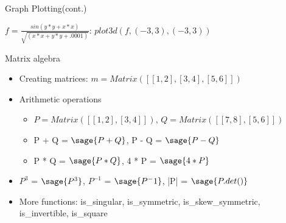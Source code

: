 \documentclass{beamer}
\begin{document}
\begin{frame}{Graph Plotting(cont.)}
  \begin{center}
    $f = \frac{sin(y*y+x*x)}{\sqrt{(x*x+y*y+.0001)}}$: $plot3d(f, (-3, 3), (-3, 3))$
  \end{center}
\end{frame}

\begin{frame}{Matrix algebra}
  \begin{itemize}
   \item Creating matrices: $m = Matrix([[1,2],[3,4],[5,6]])$
   \item Arithmetic operations
   \begin{itemize}
    \item $P = Matrix([[1, 2], [3, 4]])$, $Q = Matrix([[7, 8], [5, 6]])$
    \item P + Q = $\sage{P + Q}$, P - Q = $\sage{P - Q}$
    \item P * Q = $\sage{P * Q}$, 4 * P = $\sage{4 * P}$
   \end{itemize}
   \item $P^{3}$ = $\sage{P^3}$, $P^{-1}$ = $\sage{P^-1}$, |P| = $\sage{P.det()}$
   \item More functions: is\_singular, is\_symmetric, is\_skew\_symmetric, is\_invertible, is\_square
  \end{itemize}
\end{frame}
\end{document}
